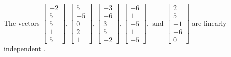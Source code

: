 \begin{exercise}
\begin{exerciseStatement}
  \end{exerciseStatement}
  \begin{exerciseAnswer}
   The vectors \(\left[\begin{array}{r}
-2 \\
5 \\
5 \\
1 \\
5
\end{array}\right] , \left[\begin{array}{r}
5 \\
-5 \\
0 \\
2 \\
1
\end{array}\right] , \left[\begin{array}{r}
-3 \\
-6 \\
3 \\
5 \\
-2
\end{array}\right] , \left[\begin{array}{r}
-6 \\
1 \\
-5 \\
1 \\
-5
\end{array}\right] , \text{ and } \left[\begin{array}{r}
2 \\
5 \\
-1 \\
-6 \\
0
\end{array}\right]\) are 
  	 linearly independent  .
  


  \end{exerciseAnswer}
\end{exercise}